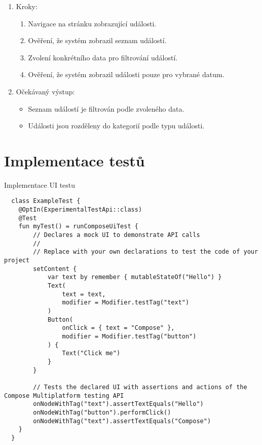 \begin{enumerate}
  \item Kroky:
    \begin{enumerate}
      \item Navigace na stránku zobrazující události.
      \item Ověření, že systém zobrazil seznam událostí.
      \item Zvolení konkrétního data pro filtrování událostí.
      \item Ověření, že systém zobrazil události pouze pro vybrané datum.
    \end{enumerate}
  \item Očekávaný výstup:
    \begin{itemize}
      \item Seznam událostí je filtrován podle zvoleného data.
      \item Události jsou rozděleny do kategorií podle typu události.
    \end{itemize}
\end{enumerate}

\section{Implementace testů}



\begin{listing}[H]
  \caption{Implementace UI testu}\label{lst:testImplementation}
  \begin{verbatim}
  class ExampleTest {
    @OptIn(ExperimentalTestApi::class)
    @Test
    fun myTest() = runComposeUiTest {
        // Declares a mock UI to demonstrate API calls
        //
        // Replace with your own declarations to test the code of your project
        setContent {
            var text by remember { mutableStateOf("Hello") }
            Text(
                text = text,
                modifier = Modifier.testTag("text")
            )
            Button(
                onClick = { text = "Compose" },
                modifier = Modifier.testTag("button")
            ) {
                Text("Click me")
            }
        }
  
        // Tests the declared UI with assertions and actions of the Compose Multiplatform testing API
        onNodeWithTag("text").assertTextEquals("Hello")
        onNodeWithTag("button").performClick()
        onNodeWithTag("text").assertTextEquals("Compose")
    }
  }
\end{verbatim}
\end{listing}


